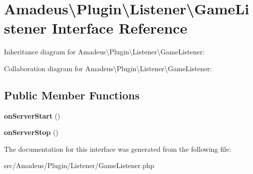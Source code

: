 \hypertarget{interfaceAmadeus_1_1Plugin_1_1Listener_1_1GameListener}{}\section{Amadeus\textbackslash{}Plugin\textbackslash{}Listener\textbackslash{}Game\+Listener Interface Reference}
\label{interfaceAmadeus_1_1Plugin_1_1Listener_1_1GameListener}


Inheritance diagram for Amadeus\textbackslash{}Plugin\textbackslash{}Listener\textbackslash{}Game\+Listener\+:


Collaboration diagram for Amadeus\textbackslash{}Plugin\textbackslash{}Listener\textbackslash{}Game\+Listener\+:
\subsection*{Public Member Functions}
\begin{DoxyCompactItemize}
\item 
\mbox{\label{interfaceAmadeus_1_1Plugin_1_1Listener_1_1GameListener_a22cba5fe1aca0f3f9bff579e214ce67c}} 
{\bfseries on\+Server\+Start} ()
\item 
\mbox{\label{interfaceAmadeus_1_1Plugin_1_1Listener_1_1GameListener_ac223c407b6b53ab49733b94859fca25c}} 
{\bfseries on\+Server\+Stop} ()
\end{DoxyCompactItemize}


The documentation for this interface was generated from the following file\+:\begin{DoxyCompactItemize}
\item 
src/\+Amadeus/\+Plugin/\+Listener/Game\+Listener.\+php\end{DoxyCompactItemize}
